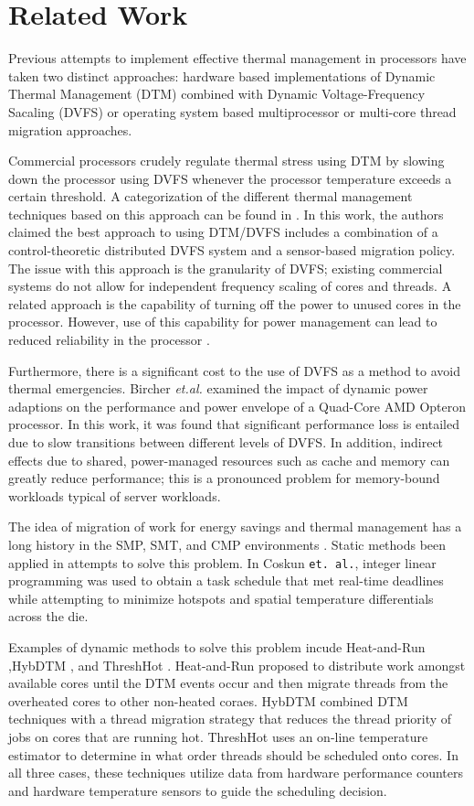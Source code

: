 \documentclass[times,10pt,onecolumn]{article}
\begin{document}
\section{Related Work}
\label{sec:related}
Previous attempts to implement effective thermal management in
processors have taken two distinct approaches: hardware based
implementations of Dynamic Thermal Management (DTM) combined with
Dynamic Voltage-Frequency Sacaling (DVFS) or operating system based
multiprocessor or multi-core thread migration approaches.

Commercial processors crudely regulate thermal stress using DTM by
slowing down the processor using DVFS whenever the processor temperature
exceeds a certain threshold.  A categorization of the different thermal
management techniques based on this approach can be found in
\cite{Donald2006}.  In this work, the authors claimed the best approach
to using DTM/DVFS includes a combination of a control-theoretic
distributed DVFS system and a sensor-based migration policy.  The issue
with this approach is the granularity of DVFS; existing commercial
systems do not allow for independent frequency scaling of cores and
threads.  A related approach is the capability of turning off the power
to unused cores in the processor.  However, use of this capability for
power management can lead to reduced reliability in the processor
\cite{Rosing2007}\cite{Coskun2008d}.

Furthermore, there is a significant cost to the use of DVFS as a method
to avoid thermal emergencies.  Bircher \textit{et.al.}
\cite{Bircher2008} examined the impact of dynamic power adaptions on the
performance and power envelope of a Quad-Core AMD Opteron processor.  In
this work, it was found that significant performance loss is entailed
due to slow transitions between different levels of DVFS.  In addition,
indirect effects due to shared, power-managed resources such as cache
and memory can greatly reduce performance; this is a pronounced problem
for memory-bound workloads typical of server workloads.

The idea of migration of work for energy savings and thermal management
has a long history in the SMP, SMT, and CMP environments
\cite{Yao1995}. Static methods been applied in attempts to solve this
problem.  In Coskun \texttt{et. al.}\cite{Coskun2008}, integer linear
programming was used to obtain a task schedule that met real-time
deadlines while attempting to minimize hotspots and spatial temperature
differentials across the die.

Examples of dynamic methods to solve this problem incude Heat-and-Run
\cite{Gomaa2004},HybDTM \cite{Kumar2006}, and ThreshHot \cite{Yang2008}.
Heat-and-Run proposed to distribute work amongst available cores until
the DTM events occur and then migrate threads from the overheated cores
to other non-heated coraes. HybDTM combined DTM techniques with a thread
migration strategy that reduces the thread priority of jobs on cores
that are running hot. ThreshHot uses an on-line temperature estimator to
determine in what order threads should be scheduled onto cores. In all
three cases, these techniques utilize data from hardware performance
counters and hardware temperature sensors to guide the scheduling
decision.
\end{document}
